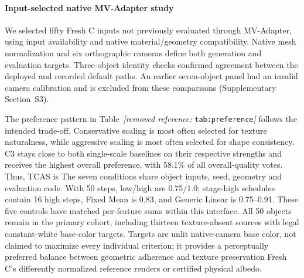 \documentclass[times,twocolumn,final]{elsarticle}
\providecommand{\DIFadd}[1]{{\protect\color{blue} \sf #1}} %
\providecommand{\DIFdel}[1]{{\protect\color{red} \scriptsize #1}} %
\providecommand{\DIFaddbegin}{} %
\providecommand{\DIFaddend}{} %
\providecommand{\DIFdelbegin}{} %
\providecommand{\DIFdelend}{} %
\begin{document}
\DIFdelbegin %
\DIFdelend \DIFaddbegin \paragraph{Input-selected native MV-Adapter study}
\label{subsec:new-mva}
\DIFadd{We selected fifty Fresh C inputs not previously evaluated through MV-Adapter, using input availability and native material/geometry compatibility. Native mesh normalization and six orthographic cameras define both generation and evaluation targets. Three-object identity checks confirmed agreement between the deployed and recorded default paths. An earlier seven-object panel had an invalid camera calibration and is excluded from these comparisons (Supplementary Section~S3).
}\DIFaddend

\DIFdelbegin \DIFdel{The preference pattern in Table~\textit{[removed reference: }\texttt{tab:preference}\textit{]} follows the intended trade-off. Conservative scaling is most often selected for texture naturalness, while aggressive scaling is most often selected for shape consistency.
C3 stays close to both single-scale baselines on their respective strengths and receives the highest overall preference, with 58.1\% of all overall-quality votes. Thus, TCAS is }\DIFdelend \DIFaddbegin \DIFadd{The seven conditions share object inputs, seed, geometry and evaluation code. With 50 steps, low/high are 0.75/1.0; stage-high schedules contain 16 high steps, Fixed Mean is 0.83, and Generic Linear is 0.75--0.91. These five controls have matched per-feature sums within this interface. All 50 objects remain in the primary cohort, including thirteen texture-absent sources with legal constant-white base-color targets. Targets are unlit native-camera base color, }\DIFaddend not \DIFdelbegin \DIFdel{claimed to maximize every individual criterion; it provides a perceptually preferred balance between geometric adherence and texture preservation}\DIFdelend \DIFaddbegin \DIFadd{Fresh C's differently normalized reference renders or certified physical albedo}\DIFaddend .
\end{document}
